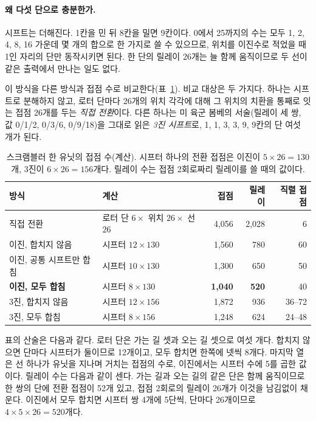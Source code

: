 \paragraph{왜 다섯 단으로 충분한가.} 시프트는 더해진다. 1칸을 민 뒤 8칸을 밀면 9칸이다. 0에서 25까지의 수는
모두 1, 2, 4, 8, 16 가운데 몇 개의 합으로 한 가지로 쓸 수 있으므로, 위치를 이진수로 적었을 때 1인 자리의
단만 동작시키면 된다. 한 단의 릴레이 26개는 늘 함께 움직이므로 두 선이 같은 출력에서 만나는 일도 없다.

이 방식을 다른 방식과 접점 수로 비교한다(표~\ref{tab:hw-contacts}). 비교 대상은 두 가지다. 하나는 시프트로
분해하지 않고, 로터 단마다 26개의 위치 각각에 대해 그 위치의 치환을 통째로 잇는 접점 26개를 두는
\emph{직접 전환}이다. 다른 하나는 미 육군 봄베의 서술(릴레이 세 쌍, 값 0/1/2, 0/3/6, 0/9/18)을 그대로 읽은
\emph{3진 시프트}로, 1, 1, 3, 3, 9, 9칸의 단 여섯 개가 된다.

\begin{table}[ht]
\centering
\caption{스크램블러 한 유닛의 접점 수(계산). 시프터 하나의 전환 접점은 이진이 $5 \times 26 = 130$개, 3진이
$6 \times 26 = 156$개다. 릴레이 수는 접점 2회로짜리 릴레이를 쓸 때의 값이다.}
\label{tab:hw-contacts}
\small
\begin{tabular}{llrrr}
\toprule
방식 & 계산 & 접점 & 릴레이 & 직렬 접점 \\
\midrule
직접 전환 & 로터 단 $6 \times$ 위치 $26 \times$ 선 $26$ & 4,056 & 2,028 & 6 \\
이진, 합치지 않음 & 시프터 $12 \times 130$ & 1,560 & 780 & 60 \\
이진, 공통 시프트만 합침 & 시프터 $10 \times 130$ & 1,300 & 650 & 50 \\
\textbf{이진, 모두 합침} & 시프터 $8 \times 130$ & \textbf{1,040} & \textbf{520} & 40 \\
3진, 합치지 않음 & 시프터 $12 \times 156$ & 1,872 & 936 & 36--72 \\
3진, 모두 합침 & 시프터 $8 \times 156$ & 1,248 & 624 & 24--48 \\
\bottomrule
\end{tabular}
\end{table}

표의 산술은 다음과 같다. 로터 단은 가는 길 셋과 오는 길 셋으로 여섯 개다. 합치지 않으면 단마다 시프터가
둘이므로 12개이고, 모두 합치면 한쪽에 넷씩 8개다. 마지막 열은 선 하나가 유닛을 지나며 거치는 접점의 수로,
이진에서는 시프터 수에 5를 곱한 값이다. 릴레이 수는 다음과 같이 센다. 가는 길과 오는 길의 같은 단은 함께
움직이므로 한 쌍의 단에 전환 접점이 52개 있고, 접점 2회로의 릴레이 26개가 이것을 남김없이 채운다. 이진에서
모두 합치면 시프터 쌍 4개에 5단씩, 단마다 26개이므로 $4 \times 5 \times 26 = 520$개다.

